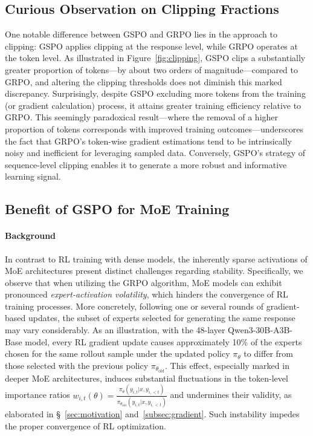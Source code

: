 \subsection{Curious Observation on Clipping Fractions}

One notable difference between GSPO and GRPO lies in the approach to clipping: GSPO applies clipping at the response level, while GRPO operates at the token level. As illustrated in Figure~\ref{fig:clipping}, GSPO clips a substantially greater proportion of tokens—by about two orders of magnitude—compared to GRPO, and altering the clipping thresholds does not diminish this marked discrepancy. Surprisingly, despite GSPO excluding more tokens from the training (or gradient calculation) process, it attains greater training efficiency relative to GRPO. This seemingly paradoxical result—where the removal of a higher proportion of tokens corresponds with improved training outcomes—underscores the fact that GRPO's token-wise gradient estimations tend to be intrinsically noisy and inefficient for leveraging sampled data. Conversely, GSPO's strategy of sequence-level clipping enables it to generate a more robust and informative learning signal.

\subsection{Benefit of GSPO for MoE Training}
\label{subsec:routing_replay}

\paragraph{Background}
In contrast to RL training with dense models, the inherently sparse activations of MoE architectures present distinct challenges regarding stability. Specifically, we observe that when utilizing the GRPO algorithm, MoE models can exhibit pronounced \textit{expert-activation volatility}, which hinders the convergence of RL training processes. More concretely, following one or several rounds of gradient-based updates, the subset of experts selected for generating the same response may vary considerably. As an illustration, with the 48-layer Qwen3-30B-A3B-Base model, every RL gradient update causes approximately 10\% of the experts chosen for the same rollout sample under the updated policy $\pi_{\theta}$ to differ from those selected with the previous policy $\pi_{\theta_\text{old}}$. This effect, especially marked in deeper MoE architectures, induces substantial fluctuations in the token-level importance ratios $w_{i,t}(\theta) = \frac{ \pi_{\theta} (y_{i,t} | x, y_{i,<t}) }{ \pi_{\theta_\text{old}} (y_{i,t} | x,y_{i,<t})}$ and undermines their validity, as elaborated in \S~\ref{sec:motivation} and~\ref{subsec:gradient}. Such instability impedes the proper convergence of RL optimization.

